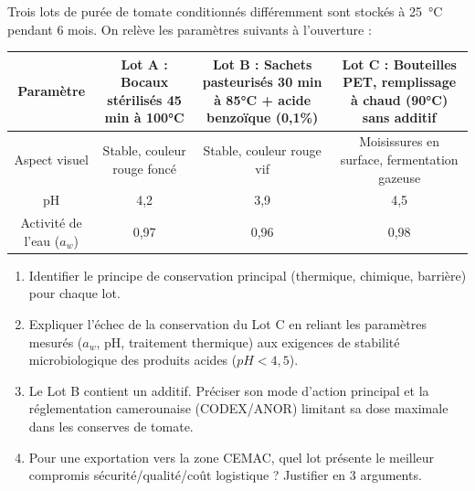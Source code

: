 \documentclass[11pt]{article}
\begin{document}
\begin{exercice}
\label{exo:conservation}
Trois lots de purée de tomate conditionnés différemment sont stockés à \SI{25}{\celsius} pendant 6 mois. On relève les paramètres suivants à l'ouverture :

\begin{center}
\begin{tabular}{|c|c|c|c|}
\hline
\textbf{Paramètre} & \textbf{Lot A : Bocaux stérilisés 45 min à 100°C} & \textbf{Lot B : Sachets pasteurisés 30 min à 85°C + acide benzoïque (0,1\%)} & \textbf{Lot C : Bouteilles PET, remplissage à chaud (90°C) sans additif} \\
\hline
Aspect visuel & Stable, couleur rouge foncé & Stable, couleur rouge vif & Moisissures en surface, fermentation gazeuse \\
pH & 4,2 & 3,9 & 4,5 \\
Activité de l'eau ($a_w$) & 0,97 & 0,96 & 0,98 \\
\hline
\end{tabular}
\end{center}

\begin{enumerate}
    \item Identifier le principe de conservation principal (thermique, chimique, barrière) pour chaque lot.
    \item Expliquer l'échec de la conservation du Lot C en reliant les paramètres mesurés ($a_w$, pH, traitement thermique) aux exigences de stabilité microbiologique des produits acides ($pH < 4,5$).
    \item Le Lot B contient un additif. Préciser son mode d'action principal et la réglementation camerounaise (CODEX/ANOR) limitant sa dose maximale dans les conserves de tomate.
    \item Pour une exportation vers la zone CEMAC, quel lot présente le meilleur compromis sécurité/qualité/coût logistique ? Justifier en 3 arguments.
\end{enumerate}
\end{exercice}
\end{document}
